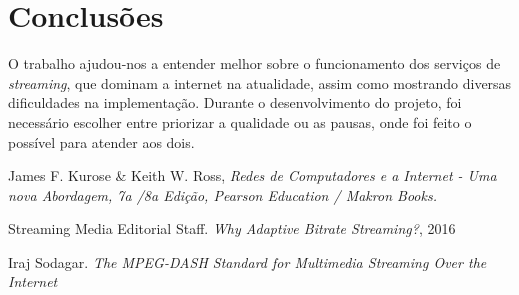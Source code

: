 \documentclass[12pt]{article}
\begin{document}
\section{Conclusões}
O trabalho ajudou-nos a entender melhor sobre o funcionamento dos serviços de \textit{streaming}, que dominam a internet na atualidade, assim como mostrando diversas dificuldades na implementação. Durante o desenvolvimento do projeto, foi necessário escolher entre priorizar a qualidade ou as pausas, onde foi feito o possível para atender aos dois.

\begin{thebibliography}{9}

\noindent James F. Kurose \& Keith W. Ross, 
\textit{Redes de Computadores e a Internet - Uma nova Abordagem, 7a /8a Edição, Pearson Education / Makron Books.}

\noindent Streaming Media Editorial Staff.
\textit{Why Adaptive Bitrate Streaming?}, 2016

\noindent Iraj Sodagar.
\textit{The MPEG-DASH Standard for Multimedia Streaming Over the Internet}

\end{thebibliography}
\end{document}
